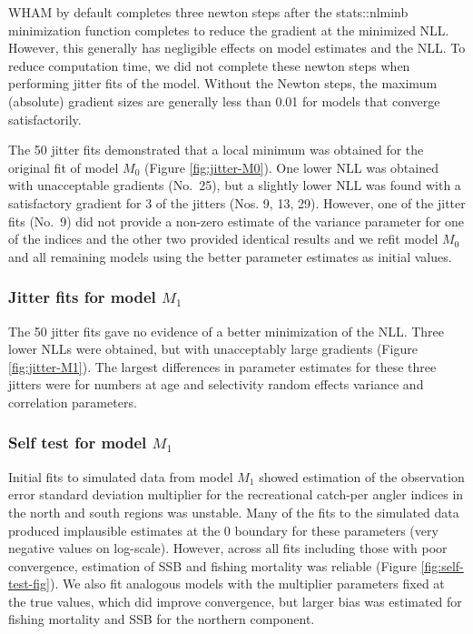 \documentclass[
]{article}
\begin{document}
WHAM by default completes three newton steps after the stats::nlminb minimization function completes to reduce the gradient at the minimized NLL. However, this generally has negligible effects on model estimates and the NLL. To reduce computation time, we did not complete these newton steps when performing jitter fits of the model. Without the Newton steps, the maximum (absolute) gradient sizes are generally less than 0.01 for models that converge satisfactorily.

The 50 jitter fits demonstrated that a local minimum was obtained for the original fit of model \(M_0\) (Figure \ref{fig:jitter-M0}). One lower NLL was obtained with unacceptable gradients (No.~25), but a slightly lower NLL was found with a satisfactory gradient for 3 of the jitters (Nos. 9, 13, 29). However, one of the jitter fits (No.~9) did not provide a non-zero estimate of the variance parameter for one of the indices and the other two provided identical results and we refit model \(M_0\) and all remaining models using the better parameter estimates as initial values.

\hypertarget{jitter-fits-for-model-m_1}{%
\subsubsection*{\texorpdfstring{Jitter fits for model \(M_1\)}{Jitter fits for model M\_1}}\label{jitter-fits-for-model-m_1}}

The 50 jitter fits gave no evidence of a better minimization of the NLL. Three lower NLLs were obtained, but with unacceptably large gradients (Figure \ref{fig:jitter-M1}). The largest differences in parameter estimates for these three jitters were for numbers at age and selectivity random effects variance and correlation parameters.

\hypertarget{self-test-for-model-m_1}{%
\subsubsection*{\texorpdfstring{Self test for model \(M_1\)}{Self test for model M\_1}}\label{self-test-for-model-m_1}}

Initial fits to simulated data from model \(M_1\) showed estimation of the observation error standard deviation multiplier for the recreational catch-per angler indices in the north and south regions was unstable. Many of the fits to the simulated data produced implausible estimates at the 0 boundary for these parameters (very negative values on log-scale). However, across all fits including those with poor convergence, estimation of SSB and fishing mortality was reliable (Figure \ref{fig:self-test-fig}). We also fit analogous models with the multiplier parameters fixed at the true values, which did improve convergence, but larger bias was estimated for fishing mortality and SSB for the northern component.
\end{document}
